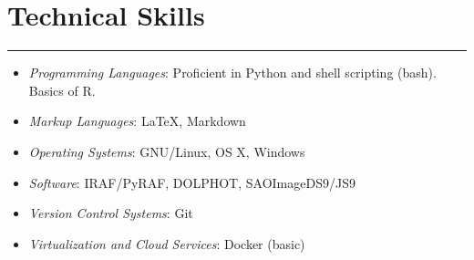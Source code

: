 \documentclass[letterpaper,10pt]{article}
\begin{document}
\section*{Technical Skills}
\hrule
\vspace{.3 cm}
    \begin{multicols}{2}




\begin{itemize}[label=$\blacktriangleright$]
	\item \emph{Programming Languages}: Proficient in Python and shell scripting (bash). Basics of R.
\end{itemize}

  \begin{itemize}[label=$\blacktriangleright$]
        \item \emph{Markup Languages}: \LaTeX, Markdown
  \end{itemize}

  \begin{itemize}[label=$\blacktriangleright$]
  \item \emph{Operating Systems}: GNU/Linux, OS X, Windows
    \end{itemize}

  \begin{itemize}[label=$\blacktriangleright$]
          \item \emph{Software}: IRAF/PyRAF, DOLPHOT, SAOImageDS9/JS9
    \end{itemize}

  \begin{itemize}[label=$\blacktriangleright$]
          \item \emph{Version Control Systems}: Git
    \end{itemize}
  
    \begin{itemize}[label=$\blacktriangleright$]
            \item \emph{Virtualization and Cloud Services}: Docker (basic)
    \end{itemize}
    
    
        \end{multicols}
\end{document}
